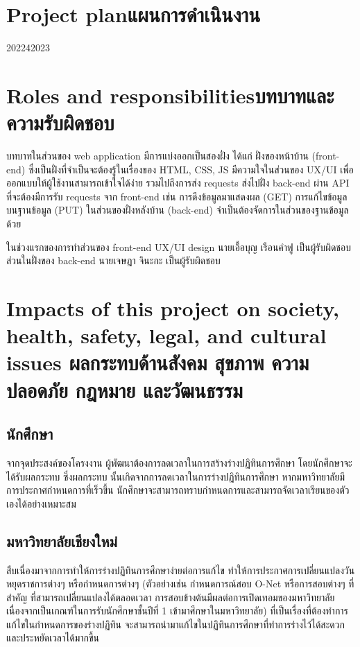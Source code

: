 \pagebreak
\section{\ifenglish Project plan\else แผนการดำเนินงาน\fi}
\begin{plan}{1}{2022}{4}{2023}
\end{plan}

\section{\ifenglish Roles and responsibilities\else บทบาทและความรับผิดชอบ\fi}
บทบาทในส่วนของ web application มีการแบ่งออกเป็นสองฝั่ง ได้แก่
%
ฝั่งของหน้าบ้าน (front-end) ซึ่งเป็นฝั่งที่จำเป็นจะต้องรู้ในเรื่องของ HTML, CSS, JS มีความใจในส่วนของ UX/UI เพื่อออกแบบให้ผู้ใช้งานสามารถเข้าใจได้ง่าย
%
รวมไปถึงการส่ง requests ส่งไปฝั่ง back-end ผ่าน API ที่จะต้องมีการรับ requests จาก front-end เช่น การดึงข้อมูลมาแสดงผล (GET) การแก้ไขข้อมูลบนฐานข้อมูล (PUT)
ในส่วนของฝั่งหลังบ้าน (back-end) จำเป็นต้องจัดการในส่วนของฐานข้อมูลด้วย
%


ในช่วงแรกของการทำส่วนของ front-end UX/UI design นายเอื้อบุญ เรือนคำฟู เป็นผู้รับผิดชอบ
%
ส่วนในฝั่งของ back-end นายเจษฎา จินะกะ เป็นผู้รับผิดชอบ

\section{\ifenglish%
      Impacts of this project on society, health, safety, legal, and cultural issues
  \else%
      ผลกระทบด้านสังคม สุขภาพ ความปลอดภัย กฎหมาย และวัฒนธรรม
  \fi}

\subsection{นักศึกษา}
จากจุดประสงค์ของโครงงาน ผู้พัฒนาต้องการลดเวลาในการสร้างร่างปฏิทินการศึกษา โดยนักศึกษาจะได้รับผลกระทบ ซึ่งผลกระทบ
%
นั้นเกิดจากการลดเวลาในการร่างปฏิทินการศึกษา หากมหาวิทยาลัยมีการประกาศกำหนดการที่เร็วขึ้น นักศึกษาจะสามารถทราบกำหนดการและสามารถจัดเวลาเรียนของตัวเองได้อย่างเหมาะสม
%

\subsection{มหาวิทยาลัยเชียงใหม่}
สืบเนื่องมาจากการทำให้การร่างปฏิทินการศึกษาง่ายต่อการแก้ไข ทำให้การประกาศการเปลี่ยนแปลงวันหยุดราชการต่างๆ หรือกำหนดการต่างๆ
%
(ตัวอย่างเช่น กำหนดการณ์สอบ O-Net หรือการสอบต่างๆ ที่สำคัญ ที่สามารถเปลี่ยนแปลงได้ตลอดเวลา การสอบข้างต้นมีผลต่อการเปิดเทอมของมหาวิทยาลัย เนื่องจากเป็นเกณฑ์ในการรับนักศึกษาชั้นปีที่ 1 เข้ามาศึกษาในมหาวิทยาลัย)
%
ที่เป็นเรื่องที่ต้องทำการแก้ไขในกำหนดการของร่างปฏิทิน จะสามารถนำมาแก้ไขในปฏิทินการศึกษาที่ทำการร่างไว้ได้สะดวกและประหยัดเวลาได้มากขึ้น

